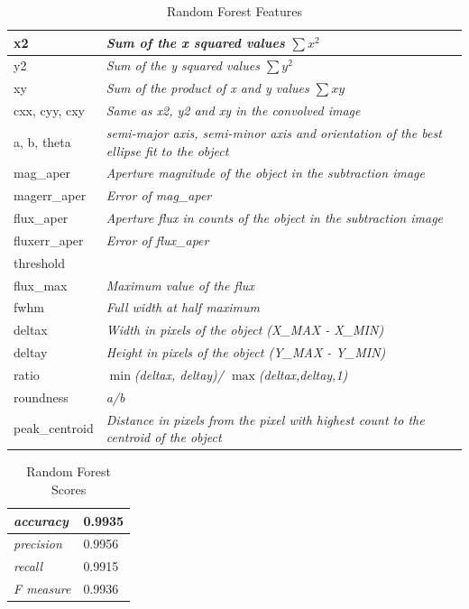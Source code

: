 \begin{table}
\centering
\begin{tabular}{|l| >{\itshape}l|}
  \hline
  x2 & Sum of the x squared values $\sum x^2 $ \\ \hline
  y2 & Sum of the y squared values $\sum y^2 $\\ \hline
  xy & Sum of the product of x and y values $\sum xy $\\ \hline
  cxx, cyy, cxy & Same as x2, y2 and xy in the convolved image  \\ \hline
  a, b, theta & semi-major axis, semi-minor axis and orientation of the best ellipse fit to the object \\ \hline
  mag\_aper & Aperture magnitude of the object in the subtraction image \\ \hline     magerr\_aper & Error of mag\_aper \\ \hline
  flux\_aper & Aperture flux in counts of the object in the subtraction image \\ \hline
  fluxerr\_aper & Error of flux\_aper \\ \hline
threshold & \\ \hline
flux\_max & Maximum value of the flux \\ \hline
fwhm & Full width at half maximum \\ \hline
deltax & Width in pixels of the object (X\_MAX - X\_MIN) \\ \hline
deltay & Height in pixels of the object (Y\_MAX - Y\_MIN) \\ \hline
ratio & $\min$(deltax, deltay)/ $\max$(deltax,deltay,1) \\ \hline
roundness & a/b\\ \hline
peak\_centroid & Distance in pixels from the pixel with highest count to the centroid of the object \\ \hline
\end{tabular}
\caption{Random Forest Features}
\label{mlfeatures}
\end{table}

\begin{table}
\centering
\begin{tabular}{| >{\itshape}l | l |}
  \hline
  accuracy & 0.9935 \\ \hline
  precision & 0.9956 \\ \hline
  recall & 0.9915 \\ \hline
  F measure & 0.9936 \\ \hline
\end{tabular}
\caption{Random Forest Scores}
\label{mlscores}
\end{table}

